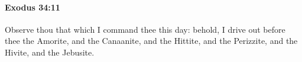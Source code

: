 
		\paragraph{Exodus 34:11} %
			\label{EXODUS-34-11}

			Observe thou that which I command thee this day: behold, I drive out before thee the Amorite, and the Canaanite, and the Hittite, and the Perizzite, and the Hivite, and the Jebusite.


